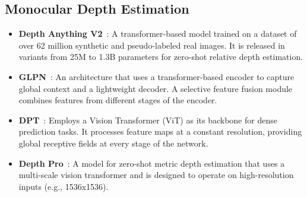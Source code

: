 \subsection{Monocular Depth Estimation}
\label{sec:monocular_depth_estimation}
\begin{itemize}
	\item \textbf{Depth Anything V2}~\cite{yang_depth__2024}: A transformer-based model trained on a dataset of over 62 million synthetic and pseudo-labeled real images. It is released in variants from 25M to 1.3B parameters for zero-shot relative depth estimation.

	\item \textbf{GLPN}~\cite{kim_global-local_2022}: An architecture that uses a transformer-based encoder to capture global context and a lightweight decoder. A selective feature fusion module combines features from different stages of the encoder.

	\item \textbf{DPT}~\cite{ranftl_vision_2021}: Employs a Vision Transformer (ViT) as its backbone for dense prediction tasks. It processes feature maps at a constant resolution, providing global receptive fields at every stage of the network.

	\item \textbf{Depth Pro}~\cite{bochkovskii_depth_2025}: A model for zero-shot metric depth estimation that uses a multi-scale vision transformer and is designed to operate on high-resolution inputs (e.g., 1536x1536).
\end{itemize}


